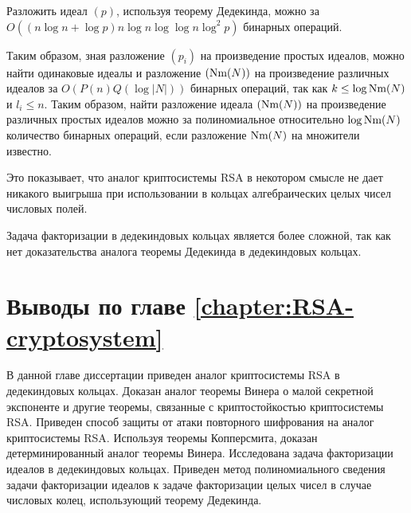 \documentclass[_00_autoref.tex]{subfiles}
\begin{document}
\begin{proposition}
    Разложить идеал $(p)$, используя теорему Дедекинда, можно за $O((n\log n + \log p)n\log n\log\log n\log^2 p)$ бинарных операций.
\end{proposition}

\begin{remark}
    Таким образом, зная разложение $(p_i)$ на произведение простых идеалов, можно найти одинаковые идеалы и разложение $(\textrm{Nm}(N))$ на произведение различных идеалов за $O(P(n)Q(\log |N|))$ бинарных операций, так как $k \le \log \textrm{Nm}(N)$ и $l_i \le n$.
    Таким образом, найти разложение идеала $(\textrm{Nm}(N))$ на произведение различных простых идеалов можно за полиномиальное относительно $\log\textrm{Nm}(N)$ количество бинарных операций, если разложение $\textrm{Nm}(N)$ на множители известно.

    Это показывает, что аналог криптосистемы RSA в некотором смысле не дает никакого выигрыша при использовании в кольцах алгебраических целых чисел числовых полей.
\end{remark}

\begin{remark}
    Задача факторизации в дедекиндовых кольцах является более сложной, так как нет доказательства аналога теоремы Дедекинда в дедекиндовых кольцах.
\end{remark}

\section*{Выводы по главе \ref{chapter:RSA-cryptosystem}}

В данной главе диссертации приведен аналог криптосистемы RSA в дедекиндовых кольцах.
Доказан аналог теоремы Винера о малой секретной экспоненте и другие теоремы, связанные с криптостойкостью криптосистемы RSA.
Приведен способ защиты от атаки повторного шифрования на аналог криптосистемы RSA.
Используя теоремы Копперсмита, доказан детерминированный аналог теоремы Винера.
Исследована задача факторизации идеалов в дедекиндовых кольцах.
Приведен метод полиномиального сведения задачи факторизации идеалов к задаче факторизации целых чисел в случае числовых колец, использующий теорему Дедекинда.
\end{document}
